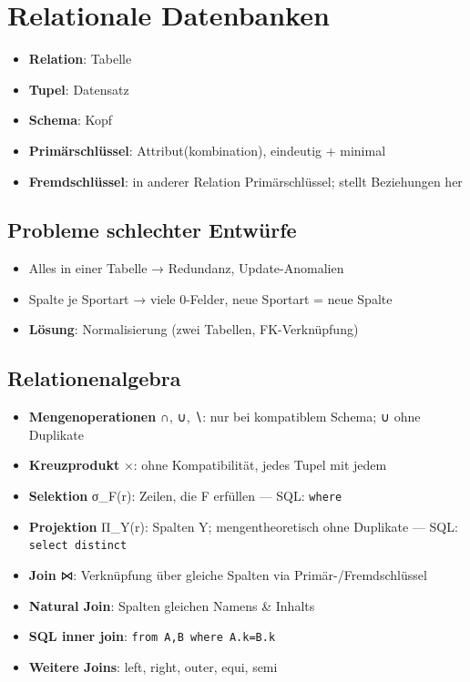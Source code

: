 \documentclass[11pt, a4paper]{article}
\begin{document}
\section{Relationale Datenbanken}

\begin{itemize}
  \item \textbf{Relation}: Tabelle
  \item \textbf{Tupel}: Datensatz
  \item \textbf{Schema}: Kopf
  \item \textbf{Primärschlüssel}: Attribut(kombination), eindeutig + minimal
  \item \textbf{Fremdschlüssel}: in anderer Relation Primärschlüssel; stellt Beziehungen her
\end{itemize}


\subsection{Probleme schlechter Entwürfe}

\begin{itemize}
  \item Alles in einer Tabelle → Redundanz, Update-Anomalien
  \item Spalte je Sportart → viele 0-Felder, neue Sportart = neue Spalte
  \item \textbf{Lösung}: Normalisierung (zwei Tabellen, FK-Verknüpfung)
\end{itemize}


\subsection{Relationenalgebra}

\begin{itemize}
  \item \textbf{Mengenoperationen} ∩, ∪, ∖: nur bei kompatiblem Schema; ∪ ohne Duplikate
  \item \textbf{Kreuzprodukt} ×: ohne Kompatibilität, jedes Tupel mit jedem
  \item \textbf{Selektion} σ\_F(r): Zeilen, die F erfüllen — SQL: \texttt{where}
  \item \textbf{Projektion} Π\_Y(r): Spalten Y; mengentheoretisch ohne Duplikate — SQL: \texttt{select distinct}
  \item \textbf{Join} ⋈: Verknüpfung über gleiche Spalten via Primär-/Fremdschlüssel
  \item \textbf{Natural Join}: Spalten gleichen Namens \& Inhalts
  \item \textbf{SQL inner join}: \texttt{from A,B where A.k=B.k}
  \item \textbf{Weitere Joins}: left, right, outer, equi, semi
\end{itemize}
\end{document}
